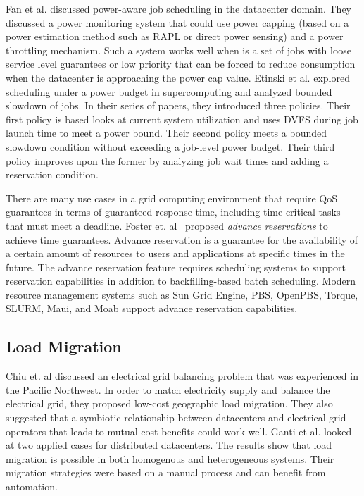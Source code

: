 Fan et al. \cite{PowerAwareServer1} discussed power-aware job scheduling in the
datacenter domain. They discussed a power monitoring system that could use
power capping (based on a power estimation method such as RAPL or direct power
sensing) and a power throttling mechanism. Such a system works well when is a
set of jobs with loose service level guarantees or low priority that can be
forced to reduce consumption when the datacenter is approaching the power cap
value. 
Etinski et al. \cite{Etinski1,Etinski2,Etinski3,Etinski4} explored
scheduling under a power budget in supercomputing and analyzed bounded slowdown
of jobs. In their series of papers, they introduced three policies. Their first
policy is based looks at current system utilization and uses DVFS during job
launch time to meet a power bound. Their second policy meets a bounded slowdown
condition without exceeding a job-level power budget. Their third policy
improves upon the former by analyzing job wait times and adding a reservation
condition. 

There are many use cases in a grid computing environment that require QoS
guarantees in terms of guaranteed response time, including time-critical tasks
that must meet a deadline. Foster et. al~\cite{foster_distributed_1999,foster_anatomy_2001} proposed \emph{advance
reservations} to achieve time guarantees. Advance reservation is a guarantee for
the availability of a certain amount of resources to users and applications at
specific times in the future. The advance reservation feature requires
scheduling systems to support reservation capabilities in addition to
backfilling-based batch scheduling. Modern resource management systems such as
Sun Grid Engine, PBS, OpenPBS, Torque, SLURM, Maui, and Moab support advance
reservation capabilities. \\

\subsection{Load Migration}
Chiu et. al \cite{chiu_electric_2012} discussed an electrical grid balancing
problem that was experienced in the Pacific Northwest. In order to match
electricity supply and balance the electrical grid, they proposed low-cost
geographic load migration. They also suggested that a symbiotic relationship
between datacenters and electrical grid operators that leads to mutual cost
benefits could work well. Ganti et al. \cite{Ghatikar2012b} looked at two
applied cases for distributed datacenters. The results show that load migration
is possible in both homogenous and heterogeneous systems. Their migration
strategies were based on a manual process and can benefit from automation.

